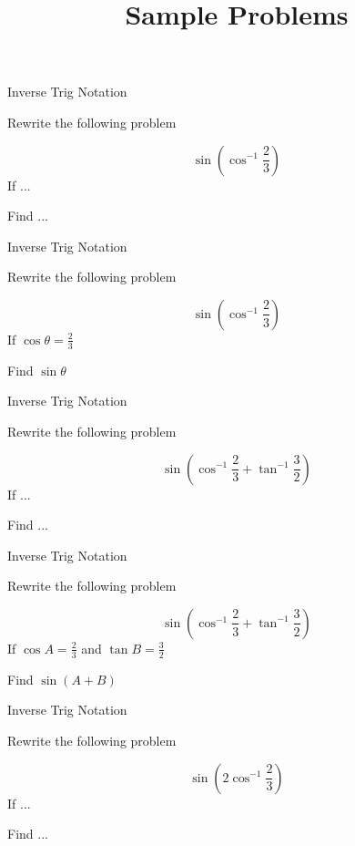 \documentclass{Ximera}
\date[mm]
\title[Sample Problems] {Sample Problems}
\begin{document}
\begin{frame}
	\titlepage
\end{frame}
	
\begin{frame}{Inverse Trig Notation}

Rewrite the following problem

\[ \sin \left (\cos^{-1}  \frac{2}{3} \right)\]
\vfill 
If ...

\bigskip

Find ...
\vfill 

\end{frame}

\begin{frame}{Inverse Trig Notation}

Rewrite the following problem

\[ \sin \left (\cos^{-1}  \frac{2}{3} \right)\]
\vfill 
If $\cos \theta = \frac{2}{3}$

\bigskip

Find $\sin \theta$
\vfill 

\end{frame}	
		\begin{frame}{Inverse Trig Notation}

Rewrite the following problem

\[ \sin \left (\cos^{-1}  \frac{2}{3} + \tan^{-1} \frac{3}{2} \right)\]
\vfill 
If ...

\bigskip

Find ...
\vfill 

\end{frame}

\begin{frame}{Inverse Trig Notation}

Rewrite the following problem

\[ \sin \left (\cos^{-1}  \frac{2}{3} + \tan^{-1} \frac{3}{2} \right)\]
\vfill 
If $\cos A = \frac{2}{3}$ and $\tan B = \frac{3}{2}$

\bigskip

Find $\sin(A+B)$

\vfill 

\end{frame}	
	\begin{frame}{Inverse Trig Notation}

Rewrite the following problem

\[ \sin \left (2 \cos^{-1}  \frac{2}{3} \right)\]
\vfill 
If ...

\bigskip

Find ...
\vfill 

\end{frame}
\end{document}
